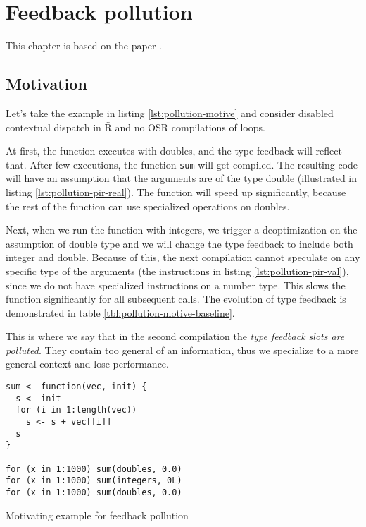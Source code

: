 \chapter{Feedback pollution}

\begin{chapterabstract}
	\todoadd
\end{chapterabstract}

This chapter is based on the paper \todocite.

\section{Motivation}

Let's take the example in listing \ref{lst:pollution-motive} and consider disabled contextual dispatch in Ř and no OSR compilations of loops.

At first, the function executes with doubles, and the type feedback will reflect that. After few executions, the function \texttt{sum} will get compiled. The resulting code will have an assumption that the arguments are of the type double (illustrated in listing \ref{lst:pollution-pir-real}). The function will speed up significantly, because the rest of the function can use specialized operations on doubles.

Next, when we run the function with integers, we trigger a deoptimization on the assumption of double type and we will change the type feedback to include both integer and double. Because of this, the next compilation cannot speculate on any specific type of the arguments (the instructions in listing \ref{lst:pollution-pir-val}), since we do not have specialized instructions on a number type. This slows the function significantly for all subsequent calls. The evolution of type feedback is demonstrated in table \ref{tbl:pollution-motive-baseline}.

This is where we say that in the second compilation the \textit{type feedback slots are polluted}. They contain too general of an information, thus we specialize to a more general context and lose performance.

\begin{listing}
	\begin{verbatim}
sum <- function(vec, init) {
  s <- init
  for (i in 1:length(vec))
    s <- s + vec[[i]]
  s
}

for (x in 1:1000) sum(doubles, 0.0)
for (x in 1:1000) sum(integers, 0L)
for (x in 1:1000) sum(doubles, 0.0)
  \end{verbatim}
	\caption{Motivating example for feedback pollution}\label{lst:pollution-motive}
\end{listing}


